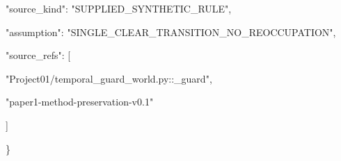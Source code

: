 \documentclass[nolineno]{ieeeaccess}
\begin{document}
{\begin{minipage}{\dimexpr\linewidth-2\fboxsep-2\fboxrule\relax}
\noindent{}\hspace{.4em}\parbox[t]{\dimexpr\linewidth-2em\relax}{\raggedright\ttfamily{}\fontsize{7.2}{9}\selectfont \hspace*{0.6em}"source\_\allowbreak kind": "SUPPLIED\_\allowbreak SYNTHETIC\_\allowbreak RULE",\allowbreak \strut}\par
\noindent{}\hspace{.4em}\parbox[t]{\dimexpr\linewidth-2em\relax}{\raggedright\ttfamily{}\fontsize{7.2}{9}\selectfont \hspace*{0.6em}"assumption": "SINGLE\_\allowbreak CLEAR\_\allowbreak TRANSITION\_\allowbreak NO\_\allowbreak REOCCUPATION",\allowbreak \strut}\par
\noindent{}\hspace{.4em}\parbox[t]{\dimexpr\linewidth-2em\relax}{\raggedright\ttfamily{}\fontsize{7.2}{9}\selectfont \hspace*{0.6em}"source\_\allowbreak refs": [\strut}\par
\noindent{}\hspace{.4em}\parbox[t]{\dimexpr\linewidth-2em\relax}{\raggedright\ttfamily{}\fontsize{7.2}{9}\selectfont \hspace*{1.2em}"Project01/temporal\_\allowbreak guard\_\allowbreak world.py::\_\allowbreak guard",\allowbreak \strut}\par
\noindent{}\hspace{.4em}\parbox[t]{\dimexpr\linewidth-2em\relax}{\raggedright\ttfamily{}\fontsize{7.2}{9}\selectfont \hspace*{1.2em}"paper1-method-preservation-v0.1"\strut}\par
\noindent{}\hspace{.4em}\parbox[t]{\dimexpr\linewidth-2em\relax}{\raggedright\ttfamily{}\fontsize{7.2}{9}\selectfont \hspace*{0.6em}]\strut}\par
\noindent{}\hspace{.4em}\parbox[t]{\dimexpr\linewidth-2em\relax}{\raggedright\ttfamily{}\fontsize{7.2}{9}\selectfont \hspace*{0.0em}\}\strut}\par
\end{minipage}}\par\smallskip
\end{document}
